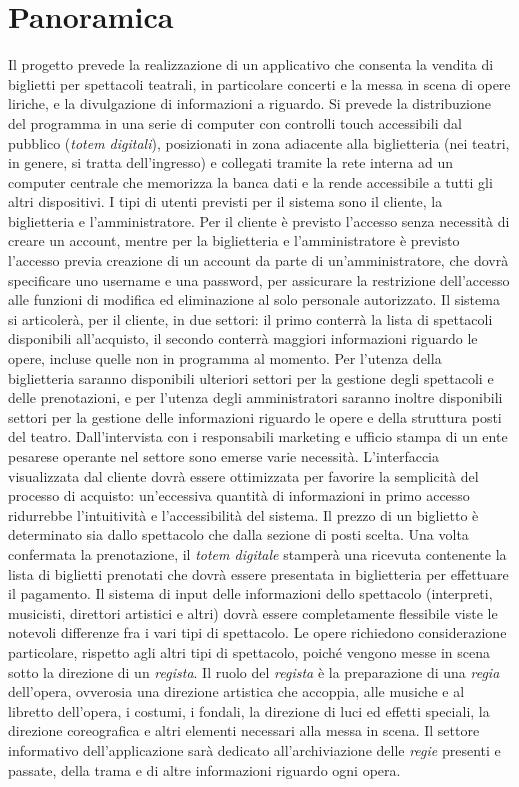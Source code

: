 
\section{Panoramica}
	Il progetto prevede la realizzazione di un applicativo che consenta la vendita di biglietti per spettacoli teatrali, in particolare concerti e la messa in scena di opere liriche, e la divulgazione di informazioni a riguardo.
	Si prevede la distribuzione del programma in una serie di computer con controlli touch accessibili dal pubblico (\textit{totem digitali}), posizionati in zona adiacente alla biglietteria (nei teatri, in genere, si tratta dell'ingresso) e collegati tramite la rete interna ad un computer centrale che memorizza la banca dati e la rende accessibile a tutti gli altri dispositivi.
	I tipi di utenti previsti per il sistema sono il cliente, la biglietteria e l'amministratore. Per il cliente è previsto l'accesso senza necessità di creare un account, mentre per la biglietteria e l'amministratore è previsto l'accesso previa creazione di un account da parte di un'amministratore, che dovrà specificare uno username e una password, per assicurare la restrizione dell'accesso alle funzioni di modifica ed eliminazione al solo personale autorizzato.
	Il sistema si articolerà, per il cliente, in due settori: il primo conterrà la lista di spettacoli disponibili all'acquisto, il secondo conterrà maggiori informazioni riguardo le opere, incluse quelle non in programma al momento.
	Per l'utenza della biglietteria saranno disponibili ulteriori settori per la gestione degli spettacoli e delle prenotazioni, e per l'utenza degli amministratori saranno inoltre disponibili settori per la gestione delle informazioni riguardo le opere e della struttura posti del teatro. 
	Dall’intervista con i responsabili marketing e ufficio stampa di un ente pesarese operante nel settore sono emerse varie necessità. 
	L’interfaccia visualizzata dal cliente dovrà essere ottimizzata per favorire la semplicità del processo di acquisto: un’eccessiva quantità di informazioni in primo accesso ridurrebbe l’intuitività e l’accessibilità del sistema.
	Il prezzo di un biglietto è determinato sia dallo spettacolo che dalla sezione di posti scelta.
	Una volta confermata la prenotazione, il \textit{totem digitale} stamperà una ricevuta contenente la lista di biglietti prenotati che dovrà essere presentata in biglietteria per effettuare il pagamento.
	Il sistema di input delle informazioni dello spettacolo (interpreti, musicisti, direttori artistici e altri) dovrà essere completamente flessibile viste le notevoli differenze fra i vari tipi di spettacolo. 
	Le opere richiedono considerazione particolare, rispetto agli altri tipi di spettacolo, poiché vengono messe in scena sotto la direzione di un \textit{regista}. Il ruolo del \textit{regista} è la preparazione di una \textit{regia} dell'opera, ovverosia una direzione artistica che accoppia, alle musiche e al libretto dell’opera, i costumi, i fondali, la direzione di luci ed effetti speciali, la direzione coreografica e altri elementi necessari alla messa in scena.
	Il settore informativo dell'applicazione sarà dedicato all'archiviazione delle \textit{regie} presenti e passate, della trama e di altre informazioni riguardo ogni opera.
